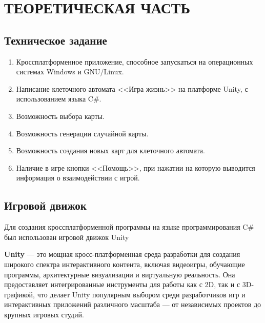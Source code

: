 \chapter{\label{ch:ch01}ТЕОРЕТИЧЕСКАЯ ЧАСТЬ} %

\section{\label{sec:ch01/sec01}Техническое задание}
\begin{enumerate}
	\item Кроссплатформенное приложение, способное запускаться на операционных системах Windows и GNU/Linux.
	\item Написание клеточного автомата <<Игра жизнь>> на платформе Unity, с использованием языка C\#.
	\item Возможность выбора карты.
	\item Возможность генерации случайной карты.
        \item Возможность создания новых карт для клеточного автомата.
	\item Наличие в игре кнопки <<Помощь>>, при нажатии на которую выводится информация о взаимодействии с игрой.
\end{enumerate}

\section{\label{sec:ch01/sec02}Игровой движок}
Для создания кроссплатформенной программы на языке программирования C\# был использован игровой движок Unity

\textbf{Unity} --- это мощная кросс-платформенная среда разработки для создания широкого спектра интерактивного контента, включая видеоигры, обучающие программы, архитектурные визуализации и виртуальную реальность. Она предоставляет интегрированные инструменты для работы как с 2D, так и с 3D-графикой, что делает Unity популярным выбором среди разработчиков игр и интерактивных приложений различного масштаба — от независимых проектов до крупных игровых студий.

